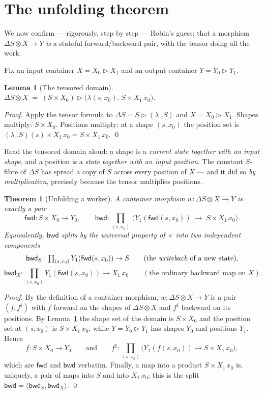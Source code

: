 \documentclass[11pt]{article}
\newcommand{\ctr}{\mathbin{\triangleright}}      %
\newcommand{\fwd}{\mathsf{fwd}}
\newcommand{\bwd}{\mathsf{bwd}}
\newcommand{\bk}[1]{{#1}^{\sharp}}                %
\theoremstyle{plain}
\newtheorem{theorem}{Theorem}
\newtheorem{lemma}{Lemma}
\theoremstyle{definition}
\begin{document}
\section{The unfolding theorem}\label{sec:unfold}

We now confirm --- rigorously, step by step --- Robin's guess: that a morphism
$\Delta S\otimes X \to Y$ \emph{is} a stateful forward/backward pair, with the tensor doing all the
work.

Fix an input container $X = X_0\ctr X_1$ and an output container $Y = Y_0\ctr Y_1$.

\begin{lemma}[The tensored domain]\label{lem:domain}
$\displaystyle \Delta S \otimes X \;=\; (S\times X_0)\ctr\big(\lambda(s,x_0).\; S\times X_1\,x_0\big).$
\end{lemma}

\begin{proof}
Apply the tensor formula to $\Delta S = S\ctr(\lambda\_.S)$ and $X=X_0\ctr X_1$. Shapes multiply:
$S\times X_0$. Positions multiply: at a shape $(s,x_0)$ the position set is
$(\lambda\_.S)(s)\times X_1\,x_0 = S\times X_1\,x_0$. \qed
\end{proof}

\noindent Read the tensored domain aloud: a shape is a \emph{current state together with an input
shape}, and a position is a \emph{state together with an input position}. The constant $S$-fibre of
$\Delta S$ has spread a copy of $S$ across every position of $X$ --- and it did so \emph{by
multiplication}, precisely because the tensor multiplies positions.

\begin{theorem}[Unfolding a worker]\label{thm:unfold}
A container morphism $w : \Delta S \otimes X \to Y$ is exactly a pair
\[
  \fwd : S\times X_0 \longrightarrow Y_0,
  \qquad
  \bwd : \textstyle\prod_{(s,x_0)}\, \big( Y_1(\fwd(s,x_0)) \;\longrightarrow\; S\times X_1\,x_0 \big).
\]
Equivalently, $\bwd$ splits by the universal property of $\times$ into two independent components
\[
  \bwd_S : \textstyle\prod_{(s,x_0)} Y_1(\fwd(s,x_0)) \to S
  \qquad(\text{the \emph{writeback} of a new state}),
\]
\[
  \bwd_X : \textstyle\prod_{(s,x_0)} Y_1(\fwd(s,x_0)) \to X_1\,x_0
  \qquad(\text{the ordinary backward map on } X).
\]
\end{theorem}

\begin{proof}
By the definition of a container morphism, $w : \Delta S\otimes X \to Y$ is a pair $(f,\bk f)$ with
$f$ forward on the shapes of $\Delta S\otimes X$ and $\bk f$ backward on its positions. By
Lemma~\ref{lem:domain} the shape set of the domain is $S\times X_0$ and the position set at
$(s,x_0)$ is $S\times X_1\,x_0$, while $Y=Y_0\ctr Y_1$ has shapes $Y_0$ and positions $Y_1$. Hence
\[
  f : S\times X_0 \to Y_0
  \qquad\text{and}\qquad
  \bk f : \textstyle\prod_{(s,x_0)}\big(Y_1(f(s,x_0)) \to S\times X_1\,x_0\big),
\]
which are $\fwd$ and $\bwd$ verbatim. Finally, a map into a product $S\times X_1\,x_0$ is, uniquely,
a pair of maps into $S$ and into $X_1\,x_0$; this is the split $\bwd=\langle\bwd_S,\bwd_X\rangle$. \qed
\end{proof}
\end{document}
